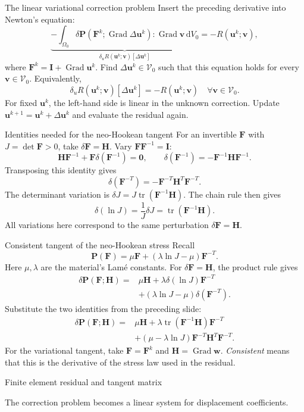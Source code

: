 \documentclass[11pt,aspectratio=169]{beamer}
\newcommand{\bu}{\bm u}
\newcommand{\bv}{\bm v}
\newcommand{\bw}{\bm w}
\newcommand{\bF}{\bm F}
\newcommand{\bP}{\bm P}
\newcommand{\bI}{\bm I}
\newcommand{\Grad}{\operatorname{Grad}}
\newcommand{\Vzero}{\mathcal V_0}
\DeclareMathOperator{\tr}{tr}
\begin{document}
\begin{frame}{The linear variational correction problem}
Insert the preceding derivative into Newton's equation:
\[
\underbrace{-\int_{\Omega_0}
\delta\bP(\bF^k;\Grad\Delta\bu^k):\Grad\bv\,\mathrm dV_0}
_{\delta_uR(\bu^k;\bv)[\Delta\bu^k]}
=-R(\bu^k;\bv),
\]
where $\bF^k=\bI+\Grad\bu^k$.
Find $\Delta\bu^k\in\Vzero$ such that this equation holds for every
$\bv\in\Vzero$. Equivalently,
\[
\boxed{\delta_uR(\bu^k;\bv)[\Delta\bu^k]=-R(\bu^k;\bv)
\quad\forall\bv\in\Vzero.}
\]
For fixed $\bu^k$, the left-hand side is linear in the unknown correction.
Update $\bu^{k+1}=\bu^k+\Delta\bu^k$ and evaluate the residual again.
\end{frame}

\begin{frame}{Identities needed for the neo-Hookean tangent}
For an invertible $\bF$ with $J=\det\bF>0$, take $\delta\bF=\bm H$.
Vary $\bF\bF^{-1}=\bI$:
\[
\bm H\bF^{-1}+\bF\delta(\bF^{-1})=\bm0,
\qquad
\delta(\bF^{-1})=-\bF^{-1}\bm H\bF^{-1}.
\]
Transposing this identity gives
\[
\boxed{\delta(\bF^{-T})=-\bF^{-T}\bm H^T\bF^{-T}.}
\]
The determinant variation is $\delta J=J\tr(\bF^{-1}\bm H)$.
The chain rule then gives
\[
\boxed{\delta(\ln J)
=\frac1J\delta J=\tr(\bF^{-1}\bm H).}
\]
All variations here correspond to the same perturbation $\delta\bF=\bm H$.
\end{frame}

\begin{frame}{Consistent tangent of the neo-Hookean stress}
Recall
\[
\bP(\bF)=\mu\bF+(\lambda\ln J-\mu)\bF^{-T}.
\]
Here $\mu,\lambda$ are the material's Lam\'e constants.
For $\delta\bF=\bm H$, the product rule gives
\[
\begin{aligned}
\delta\bP(\bF;\bm H)
={}&\mu\bm H
+\lambda\delta(\ln J)\bF^{-T}\\
&+(\lambda\ln J-\mu)\delta(\bF^{-T}).
\end{aligned}
\]
Substitute the two identities from the preceding slide:
\[
\boxed{\begin{aligned}
\delta\bP(\bF;\bm H)
={}&\mu\bm H
+\lambda\tr(\bF^{-1}\bm H)\bF^{-T}\\
&+(\mu-\lambda\ln J)\bF^{-T}\bm H^T\bF^{-T}.
\end{aligned}}
\]
For the variational tangent, take $\bF=\bF^k$ and $\bm H=\Grad\bw$.
\emph{Consistent} means that this is the derivative of the stress law used
in the residual.
\end{frame}

\begin{frame}
\centering\vfill
{\LARGE Finite element residual and tangent matrix\par}
\vspace{0.5cm}
The correction problem becomes a linear system for displacement coefficients.
\vfill
\end{frame}
\end{document}
